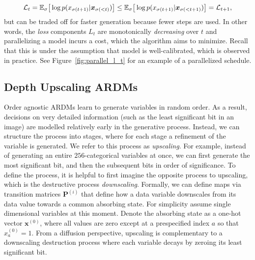 \documentclass{article} \usepackage{iclr2022_conference,times}
\def\vx{{\bm{x}}}
\begin{document}
\begin{equation}
\label{eq:monotonicity_start} \small
\mathcal{L}_t = \mathbb{E}_{\sigma} \big{[}\log p(x_{\sigma(t + 1)} | \vx_{\sigma(<t)}) \big{]} \leq \mathbb{E}_{\sigma} \big{[}\log p(x_{\sigma(t + 1)} | \vx_{\sigma(<t+1)})\big{]} =  \mathcal{L}_{t+1}, 
\end{equation}
but can be traded off for faster generation because fewer steps are used. In other words, the \textit{loss} components $L_t$ are monotonically \textit{decreasing} over $t$ and parallelizing a model incurs a cost, which the algorithm aims to minimize. Recall that this is under the assumption that model is well-calibrated, which is observed in practice. See Figure~\ref{fig:parallel_l_t} for an example of a parallelized schedule.


\subsection{Depth Upscaling ARDMs}
Order agnostic ARDMs learn to generate variables in random order. As a result, decisions on very detailed information (such as the least significant bit in an image) are modelled relatively early in the generative process. Instead, we can structure the process into stages, where for each stage a refinement of the variable is generated. We refer to this process as \textit{upscaling}. For example, instead of generating an entire $256$-categorical variables at once, we can first generate the most significant bit, and then the subsequent bits in order of significance. To define the process, it is helpful to first imagine the opposite process to upscaling, which is the destructive process \textit{downscaling}. Formally, we can define maps via transition matrices $\mathbf{P}^{(i)}$ that define how a data variable downscales from its data value towards a common absorbing state. For simplicity assume single dimensional variables at this moment. Denote the absorbing state as a one-hot vector $\vx^{(0)}$, where all values are zero except at a prespecified index $a$ so that $x^{(0)}_a = 1$. From a diffusion perspective, upscaling is complementary to a downscaling destruction process where each variable decays by zeroing its least significant bit.
\end{document}

